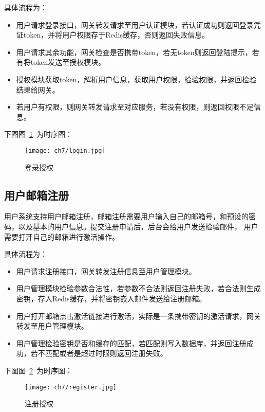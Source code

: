 具体流程为：
\begin{itemize}
    \item 用户请求登录接口，网关转发请求至用户认证模块，若认证成功则返回登录凭证token，并将用户权限存于Redis缓存，否则返回失败信息。
    \item 用户请求其余功能，网关检查是否携带token，若无token则返回登陆提示，若有将token发送至授权模块。
    \item 授权模块获取token，解析用户信息，获取用户权限，检验权限，并返回检验结果给网关。
    \item 若用户有权限，则网关转发请求至对应服务，若没有权限，则返回权限不足信息。
\end{itemize}

下图图~\ref{fig:login}~为时序图：
\begin{figure}[htbp]
    \centering
    \texttt{[image: ch7/login.jpg]}
    \caption{登录授权}\label{fig:login}
    \vspace{\baselineskip} %
\end{figure}

\subsection{用户邮箱注册}
用户系统支持用户邮箱注册，邮箱注册需要用户输入自己的邮箱号，和预设的密码，以及基本的用户信息。提交注册申请后，后台会给用户发送检验邮件，
用户需要打开自己的邮箱进行激活操作。

具体流程为：
\begin{itemize}
    \item 用户请求注册接口，网关转发注册信息至用户管理模块。
    \item 用户管理模块检验参数合法性，若参数不合法则返回注册失败，若合法则生成密钥，存入Redis缓存，并将密钥嵌入邮件发送给注册邮箱。
    \item 用户打开邮箱点击激活链接进行激活，实际是一条携带密钥的激活请求，网关转发至用户管理模块。
    \item 用户管理检验密钥是否和缓存的匹配，若匹配则写入数据库，并返回注册成功，若不匹配或者是超过时限则返回注册失败。
\end{itemize}

下图图~\ref{fig:register}~为时序图：
\begin{figure}[htbp]
    \centering
    \texttt{[image: ch7/register.jpg]}
    \caption{注册授权}\label{fig:register}
    \vspace{\baselineskip} %
\end{figure}


